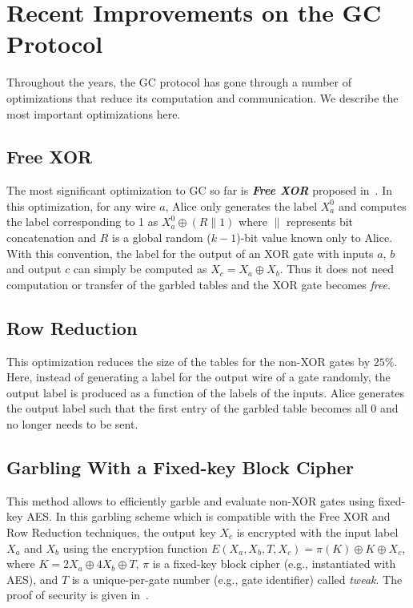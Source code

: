 \section{Recent Improvements on the GC Protocol}
Throughout the years, the GC protocol has gone through a number of optimizations that reduce its computation and communication.
We describe the most important optimizations here.

\subsection{Free XOR~\cite{kolesnikov2008improved}}
The most significant optimization to GC so far is \textbf{\textit{Free XOR}} proposed in~\cite{kolesnikov2008improved}.
In this optimization, for any wire $a$, Alice only generates the label $X_a^{0}$ and computes the label corresponding to 1 as $X_a^{0}\oplus (R \parallel 1)$ where $\parallel$ represents bit concatenation and
$R$ is a global random ($k-1$)-bit value known only to Alice.
With this convention, the label for the output of an XOR gate with inputs $a$, $b$ and output $c$ can simply be computed as $X_{c} = X_{a} \oplus X_{b}$.
Thus it does not need computation or transfer of the garbled tables and the XOR gate becomes \textit{free}.

\subsection{Row Reduction~\cite{naor1999privacy}}
This optimization reduces the size of the tables for the non-XOR gates by $25\%$.
Here, instead of generating a label for the output wire of a gate randomly, the output label is produced as a function of the labels of the inputs.
Alice generates the output label such that the first entry of the garbled table becomes all $0$ and no longer needs to be sent.

\subsection{Garbling With a Fixed-key Block Cipher~\cite{bellare2013efficient}}
This method allows to efficiently garble and evaluate non-XOR gates using fixed-key AES.
In this garbling scheme which is compatible with the Free XOR and Row Reduction techniques, the output key $X_{c}$ is encrypted with the input label $X_{a}$ and $X_{b}$ using the encryption function $E(X_a,X_b,T,X_c) = \pi(K) \oplus K \oplus X_c$, where $K=2X_a\oplus4X_b\oplus T$, $\pi$ is a fixed-key block cipher (e.g., instantiated with AES), and $T$ is a unique-per-gate number (e.g., gate identifier) called \emph{tweak}.
The proof of security is given in~\cite{bellare2013efficient}.

